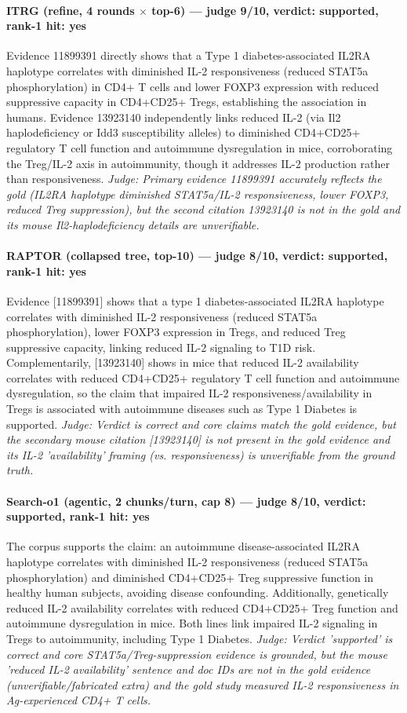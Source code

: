 \documentclass[sigconf, review, anonymous]{acmart}
\begin{document}
\paragraph{ITRG (refine, 4 rounds $\times$ top-6) --- judge 9/10, verdict: supported, rank-1 hit: yes}
\noindent Evidence 11899391 directly shows that a Type 1 diabetes-associated IL2RA haplotype correlates with diminished IL-2 responsiveness (reduced STAT5a phosphorylation) in CD4+ T cells and lower FOXP3 expression with reduced suppressive capacity in CD4+CD25+ Tregs, establishing the association in humans. Evidence 13923140 independently links reduced IL-2 (via Il2 haplodeficiency or Idd3 susceptibility alleles) to diminished CD4+CD25+ regulatory T cell function and autoimmune dysregulation in mice, corroborating the Treg/IL-2 axis in autoimmunity, though it addresses IL-2 production rather than responsiveness.
\noindent\small\textit{Judge: Primary evidence 11899391 accurately reflects the gold (IL2RA haplotype  diminished STAT5a/IL-2 responsiveness, lower FOXP3, reduced Treg suppression), but the second citation 13923140 is not in the gold and its mouse Il2-haplodeficiency details are unverifiable.}
\paragraph{RAPTOR (collapsed tree, top-10) --- judge 8/10, verdict: supported, rank-1 hit: yes}
\noindent Evidence [11899391] shows that a type 1 diabetes-associated IL2RA haplotype correlates with diminished IL-2 responsiveness (reduced STAT5a phosphorylation), lower FOXP3 expression in Tregs, and reduced Treg suppressive capacity, linking reduced IL-2 signaling to T1D risk. Complementarily, [13923140] shows in mice that reduced IL-2 availability correlates with reduced CD4+CD25+ regulatory T cell function and autoimmune dysregulation, so the claim that impaired IL-2 responsiveness/availability in Tregs is associated with autoimmune diseases such as Type 1 Diabetes is supported.
\noindent\small\textit{Judge: Verdict is correct and core claims match the gold evidence, but the secondary mouse citation [13923140] is not present in the gold evidence and its IL-2 'availability' framing (vs. responsiveness) is unverifiable from the ground truth.}
\paragraph{Search-o1 (agentic, 2 chunks/turn, cap 8) --- judge 8/10, verdict: supported, rank-1 hit: yes}
\noindent The corpus supports the claim: an autoimmune disease-associated IL2RA haplotype correlates with diminished IL-2 responsiveness (reduced STAT5a phosphorylation) and diminished CD4+CD25+ Treg suppressive function in healthy human subjects, avoiding disease confounding. Additionally, genetically reduced IL-2 availability correlates with reduced CD4+CD25+ Treg function and autoimmune dysregulation in mice. Both lines link impaired IL-2 signaling in Tregs to autoimmunity, including Type 1 Diabetes.
\noindent\small\textit{Judge: Verdict 'supported' is correct and core STAT5a/Treg-suppression evidence is grounded, but the mouse 'reduced IL-2 availability' sentence and doc IDs are not in the gold evidence (unverifiable/fabricated extra) and the gold study measured IL-2 responsiveness in Ag-experienced CD4+ T cells.}
\end{document}
